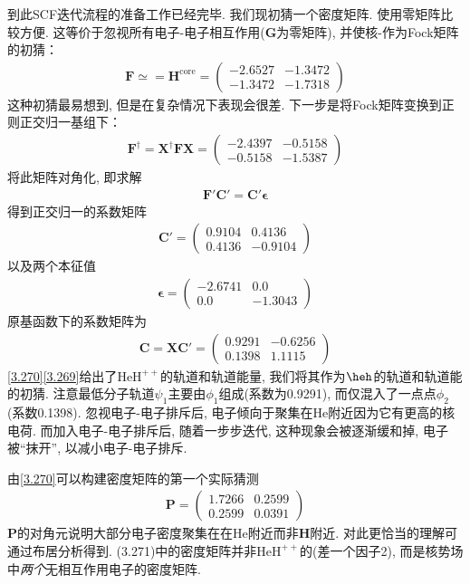 到此SCF迭代流程的准备工作已经完毕. 
我们现初猜一个密度矩阵. 
使用零矩阵比较方便. 
这等价于忽视所有电子-电子相互作用($\mathbf{G}$为零矩阵), 
并使核-\ha 作为Fock矩阵的初猜：
\begin{align}
	\mathbf{F}\simeq=\mathbf{H}^\mathrm{core}=
	\begin{pmatrix}
		-2.6527&-1.3472\\-1.3472&-1.7318
	\end{pmatrix}
\end{align}
这种初猜最易想到, 
但是在复杂情况下表现会很差. 
下一步是将Fock矩阵变换到正则正交归一基组下：
\begin{align}
	\mathbf{F^\dagger=X^\dagger FX}=
	\begin{pmatrix}
		-2.4397&-0.5158\\-0.5158&-1.5387
	\end{pmatrix}
\end{align}
将此矩阵对角化, 
即求解
\begin{align}
	\mathbf{F'C'=C'}{\boldsymbol\epsilon}
\end{align}
得到正交归一的系数矩阵
\begin{align}
	\mathbf{C'}=
	\begin{pmatrix}
		0.9104&0.4136\\0.4136&-0.9104
	\end{pmatrix}
\end{align}
以及两个本征值
\begin{align}
	\label{3.269}
	\bm{\epsilon}=
	\begin{pmatrix}
		-2.6741&0.0\\0.0&-1.3043
	\end{pmatrix}
\end{align}
原基函数下的系数矩阵为
\begin{align}
	\mathbf{C=XC'}=
	\begin{pmatrix}
		0.9291&-0.6256\\0.1398&1.1115
	\end{pmatrix}
	\label{3.270}
\end{align}
\autoref{3.270}\autoref{3.269}给出了$\mathrm{HeH}^{++}$的轨道和轨道能量, 
我们将其作为$\heh$的轨道和轨道能的初猜. 
注意最低分子轨道$\psi_1$主要由$\phi_1$组成(系数为0.9291), 
而仅混入了一点点$\phi_2$(系数0.1398). 
忽视电子-电子排斥后, 
电子倾向于聚集在$\mathrm{He}$附近因为它有更高的核电荷. 
而加入电子-电子排斥后, 
随着一步步迭代, 
这种现象会被逐渐缓和掉, 
电子被``抹开”, 
以减小电子-电子排斥.


由\autoref{3.270}可以构建密度矩阵的第一个实际猜测
\begin{align}
	\mathbf{P}=
	\begin{pmatrix}
		1.7266&0.2599\\0.2599&0.0391
	\end{pmatrix}
\end{align}
$\mathbf{P}$的对角元说明大部分电子密度聚集在在$\mathrm{He}$附近而非$\mathbf{H}$附近. 
对此更恰当的理解可通过布居分析得到. 
(3.271)中的密度矩阵并非$\mathrm{HeH}^{++}$的(差一个因子2), 而是核势场中\emph{两个}无相互作用电子的密度矩阵.

